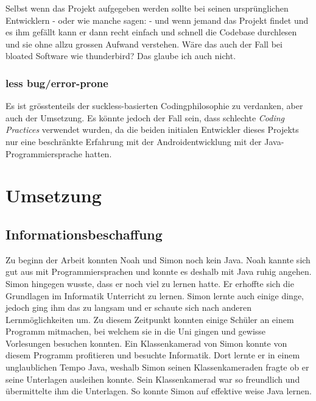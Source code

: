 \documentclass[a4paper,11pt]{article}
\begin{document}
Selbst wenn das Projekt aufgegeben werden sollte bei seinen ursprünglichen Entwicklern - oder wie manche sagen:  - und wenn jemand das Projekt findet und es ihm gefällt kann er dann recht einfach und schnell die Codebase durchlesen und sie ohne allzu grossen Aufwand verstehen. Wäre das auch der Fall bei bloated Software wie thunderbird? Das glaube ich auch nicht.

\subsubsection{less bug/error-prone}
Es ist grösstenteils der suckless-basierten Codingphilosophie zu verdanken, aber auch der Umsetzung. Es könnte jedoch der Fall sein, dass schlechte \textit{Coding Practices} verwendet wurden, da die beiden initialen Entwickler dieses Projekts nur eine beschränkte Erfahrung mit der Androidentwicklung mit der Java-Programmiersprache hatten.

\section{Umsetzung}

\subsection{Informationsbeschaffung}

Zu beginn der Arbeit konnten Noah und Simon noch kein Java. Noah kannte sich gut aus mit Programmiersprachen und konnte es deshalb mit Java ruhig angehen.
Simon hingegen wusste, dass er noch viel zu lernen hatte. Er erhoffte sich die Grundlagen im Informatik Unterricht zu lernen. 
Simon lernte auch einige dinge, jedoch ging ihm das zu langsam und er schaute sich nach anderen Lernmöglichkeiten um. 
Zu diesem Zeitpunkt konnten einige Schüler an einem Programm mitmachen, bei welchem sie in die Uni gingen und gewisse 
Vorlesungen besuchen konnten. Ein Klassenkamerad von Simon konnte von diesem Programm profitieren und besuchte Informatik. 
Dort lernte er in einem unglaublichen Tempo Java, weshalb Simon seinen Klassenkameraden fragte ob er seine Unterlagen ausleihen konnte. 
Sein Klassenkamerad war so freundlich und übermittelte ihm die Unterlagen. So konnte Simon auf effektive weise Java lernen. \\
\end{document}
